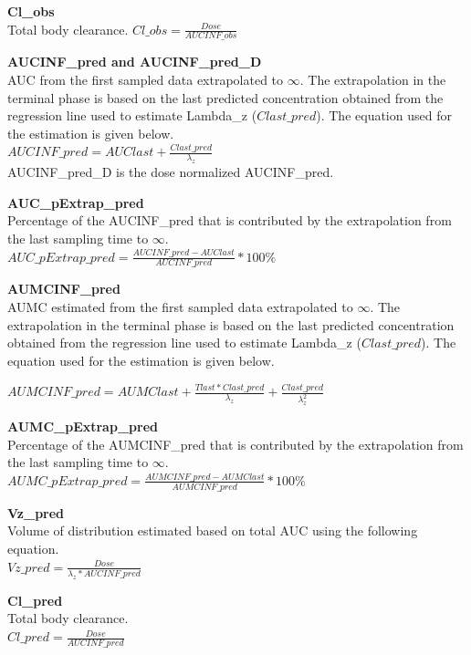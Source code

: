 \documentclass[12pt,]{krantz}
\begin{document}
\textbf{Cl\_obs}\\
Total body clearance.
\(Cl\_obs = \frac{Dose}{AUCINF\_obs}\)

\textbf{AUCINF\_pred and AUCINF\_pred\_D}\\
AUC from the first sampled data extrapolated to \({\infty}\). The extrapolation in the terminal phase is based on the last predicted concentration obtained from the regression line used to estimate Lambda\_z (\({Clast\_pred}\)). The equation used for the estimation is given below.\\
\(AUCINF\_pred = AUClast+\frac{Clast\_pred}{\lambda_z}\)\\
AUCINF\_pred\_D is the dose normalized AUCINF\_pred.

\textbf{AUC\_pExtrap\_pred}\\
Percentage of the AUCINF\_pred that is contributed by the extrapolation from the last sampling time to \({\infty}\).\\
\(AUC\_pExtrap\_pred = \frac{AUCINF\_pred-AUClast}{AUCINF\_pred}*100\%\)

\textbf{AUMCINF\_pred}\\
AUMC estimated from the first sampled data extrapolated to \({\infty}\). The extrapolation in the terminal phase is based on the last predicted concentration obtained from the regression line used to estimate Lambda\_z (\({Clast\_pred}\)). The equation used for the estimation is given below.

\(AUMCINF\_pred = AUMClast+\frac{Tlast*Clast\_pred}{\lambda_z}+\frac{Clast\_pred}{\lambda_{z}^2}\)

\textbf{AUMC\_pExtrap\_pred}\\
Percentage of the AUMCINF\_pred that is contributed by the extrapolation from the last sampling time to \({\infty}\).\\
\(AUMC\_pExtrap\_pred = \frac{AUMCINF\_pred-AUMClast}{AUMCINF\_pred}*100\%\)

\textbf{Vz\_pred}\\
Volume of distribution estimated based on total AUC using the following equation.\\
\(Vz\_pred = \frac{Dose}{\lambda_z*AUCINF\_pred}\)

\textbf{Cl\_pred}\\
Total body clearance.\\
\(Cl\_pred = \frac{Dose}{AUCINF\_pred}\)
\end{document}

